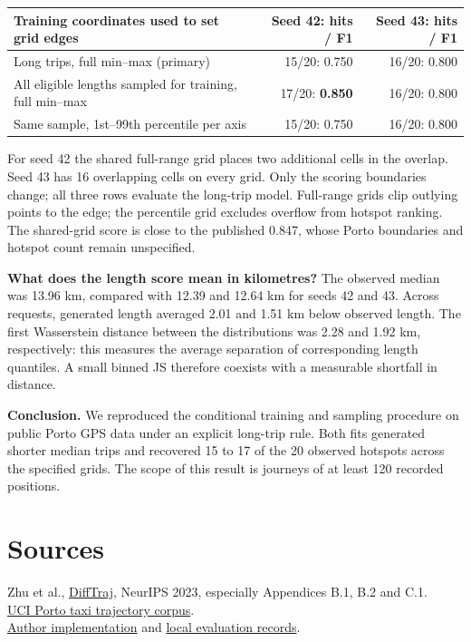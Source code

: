\documentclass[11pt,a4paper]{article}
\begin{document}
\begin{center}\small
\begin{tabular}{lrr}\toprule
Training coordinates used to set grid edges & Seed 42: hits / F1 & Seed 43: hits / F1\\\midrule
Long trips, full min--max (primary) & 15/20: 0.750 & 16/20: 0.800\\
All eligible lengths sampled for training, full min--max & 17/20: \textbf{0.850} & 16/20: 0.800\\
Same sample, 1st--99th percentile per axis & 15/20: 0.750 & 16/20: 0.800\\\bottomrule
\end{tabular}\end{center}
For seed 42 the shared full-range grid places two additional cells in the overlap. Seed 43 has 16 overlapping cells on every grid. Only the scoring boundaries change; all three rows evaluate the long-trip model. Full-range grids clip outlying points to the edge; the percentile grid excludes overflow from hotspot ranking. The shared-grid score is close to the published 0.847, whose Porto boundaries and hotspot count remain unspecified.

\textbf{What does the length score mean in kilometres?} The observed median was 13.96 km, compared with 12.39 and 12.64 km for seeds 42 and 43. Across requests, generated length averaged 2.01 and 1.51 km below observed length. The first Wasserstein distance between the distributions was 2.28 and 1.92 km, respectively: this measures the average separation of corresponding length quantiles. A small binned JS therefore coexists with a measurable shortfall in distance.

\textbf{Conclusion.} We reproduced the conditional training and sampling procedure on public Porto GPS data under an explicit long-trip rule. Both fits generated shorter median trips and recovered 15 to 17 of the 20 observed hotspots across the specified grids. The scope of this result is journeys of at least 120 recorded positions. 

\section*{Sources}
Zhu et al., \href{https://proceedings.neurips.cc/paper_files/paper/2023/hash/cd9b4a28fb9eebe0430c3312a4898a41-Abstract.html}{DiffTraj}, NeurIPS 2023, especially Appendices B.1, B.2 and C.1.\\
\href{https://archive.ics.uci.edu/dataset/339/}{UCI Porto taxi trajectory corpus}.\\
\href{https://github.com/Yasoz/DiffTraj}{Author implementation} and \href{https://github.com/LiuJingting0201/cnr-road-gaf-diffusion/tree/main/docs/results/porto-metric-review}{local evaluation records}.
\end{document}
